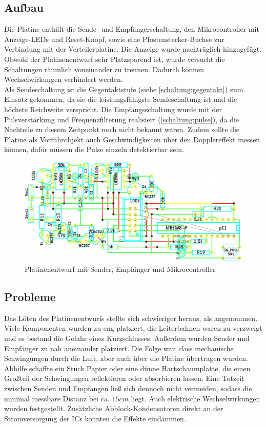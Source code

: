\subsection{Aufbau}
Die Platine enthält die Sende- und Empfängerschaltung, den Mikrocontroller mit Anzeige-LEDs und Reset-Knopf, sowie eine Pfostenstecker-Buchse zur Verbindung mit der Verteilerplatine. Die Anzeige wurde nachträglich hinzugefügt. Obwohl der Platinenentwurf sehr Platzsparend ist, wurde versucht die Schaltungen räumlich voneinander zu trennen. Dadurch können Wechselwirkungen verhindert werden.\\
Als Sendeschaltung ist die Gegentaktstufe (siehe \ref{schaltung:gegentakt}) zum Einsatz gekommen, da sie die leistungsfähigste Sendeschaltung ist und die höchste Reichweite verspricht. Die Empfangsschaltung wurde mit der Pulsverstärkung und Frequenzfilterung realisiert (\ref{schaltung:pulse}), da die Nachteile zu diesem Zeitpunkt noch nicht bekannt waren. Zudem sollte die Platine als Vorführobjekt auch Geschwindigkeiten über den Dopplereffekt messen können, dafür müssen die Pulse einzeln detektierbar sein.

\begin{figure}[H]
	\centering
	\includegraphics[width=(\textwidth)]{images/prototyp_2d.png}
	\caption{Platinenentwurf mit Sender, Empfänger und Mikrocontroller} \label{img:prototyp2d}
\end{figure}

\subsection{Probleme}
Das Löten des Platinenentwurfs stellte sich schwieriger heraus, als angenommen. Viele Komponenten wurden zu eng platziert, die Leiterbahnen waren zu verzweigt und es bestand die Gefahr eines Kurzschlusses. Außerdem wurden Sender und Empfänger zu nah aneinander platziert. Die Folge war, dass mechanische Schwingungen durch die Luft, aber auch über die Platine übertragen wurden. Abhilfe schaffte ein Stück Papier oder eine dünne Hartschaumplatte, die einen Großteil der Schwingungen reflektieren oder absorbieren lassen. Eine Totzeit zwischen Senden und Empfangen ließ sich dennoch nicht vermeiden, sodass die minimal messbare Distanz bei ca. $15cm$ liegt. Auch elektrische Wechselwirkungen wurden festgestellt. Zusätzliche Abblock-Kondensatoren direkt an der Stromversorgung der \acp{IC} konnten die Effekte eindämmen.


